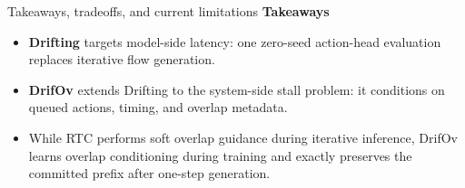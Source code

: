 \documentclass[aspectratio=169,10pt]{beamer}
\begin{document}
\begin{frame}{Takeaways, tradeoffs, and current limitations}
  \small
  \textbf{Takeaways}
  \begin{itemize}
    \item \textbf{Drifting} targets model-side latency: one zero-seed action-head
          evaluation replaces iterative flow generation.
    \item \textbf{DrifOv} extends Drifting to the system-side stall problem:
          it conditions on queued actions, timing, and overlap metadata.
    \item While RTC performs soft overlap guidance during iterative inference, DrifOv learns overlap conditioning during training and exactly preserves the committed prefix after one-step generation.


  \end{itemize}

\end{frame}
\end{document}
